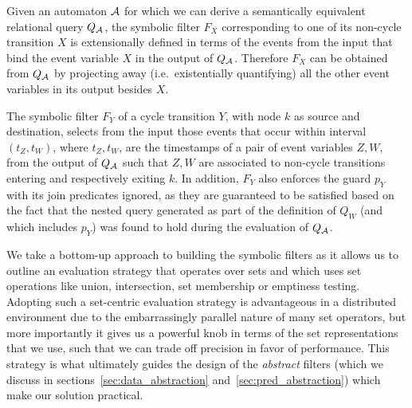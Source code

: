 Given an automaton $\mathcal{A}$ for which we can derive a semantically equivalent  
relational query $Q_{\mathcal{A}}$, the symbolic filter $F_X$ corresponding to one of 
its non-cycle transition $X$ is extensionally defined in terms of the events 
from the input that bind the event variable $X$ in the output of $Q_{\mathcal{A}}$. 
Therefore $F_X$ can be obtained from $Q_{\mathcal{A}}$ by projecting away (i.e.\ 
existentially quantifying) all the other event variables in its output besides 
$X$.

The symbolic filter $F_Y$ of a cycle transition $Y$, with node $k$ as source 
and destination, selects from the input those events that occur within interval 
$(t_Z, t_W)$, where $t_Z, t_W$, are the timestamps of a pair of event variables 
$Z, W$, from the output of $Q_{\mathcal{A}}$ such that $Z, W$ are associated to 
non-cycle transitions entering and respectively exiting $k$.
In addition, $F_Y$ also enforces the guard $p_Y$ with its join predicates 
ignored, as they are guaranteed to be satisfied based on the fact that the 
nested query generated as part of the definition of $Q_W$ (and which includes 
$p_Y$) was found to hold during the evaluation of $Q_{\mathcal{A}}$.

We take a bottom-up approach to building the symbolic filters as it allows us 
to outline an evaluation strategy that operates over sets and which uses set 
operations like union, intersection, set membership or emptiness testing. 
Adopting such a set-centric evaluation strategy is advantageous in a 
distributed environment due to the embarrassingly parallel nature of many set 
operators, but more importantly it gives us a powerful knob in terms of the set 
representations that we use, such that we can trade off precision in favor of 
performance. 
This strategy is what ultimately guides the design of the {\em abstract} 
filters (which we discuss in sections~\ref{sec:data_abstraction} 
and~\ref{sec:pred_abstraction}) which make our solution practical.
   

